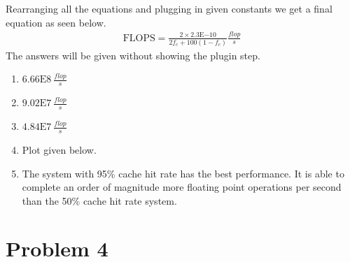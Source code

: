 \documentclass[12pt]{exam}
\begin{document}
        Rearranging all the equations and plugging in given constants we get a final equation as seen below.
        \begin{gather*}
            \text{FLOPS} = \frac{2\times 2.3\mathrm{E}{-10}}{2f_c+100(1-f_c)}\frac{flop}{s}
        \end{gather*}
        The answers will be given without showing the plugin step.

        \begin{enumerate}
            \item $6.66\mathrm{E}{8}~\frac{flop}{s}$ 
            \item $9.02\mathrm{E}{7}~\frac{flop}{s}$
            \item $4.84\mathrm{E}{7}~\frac{flop}{s}$
            \item Plot given below.
            


            \begin{center}
                \end{center}

            \item  The system with 95\% cache hit rate has the best performance. It is able to complete an order of magnitude more floating point operations per second than the 50\% cache hit rate system.
            
        \end{enumerate}

        
    \section*{\label{sec:prob4} Problem 4}
\end{document}
